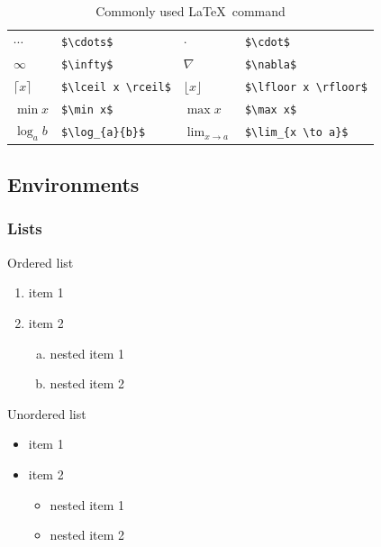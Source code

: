 \begin{table}[!ht]
\begin{tabular}{llll}
		$\cdots$                     & \verb|$\cdots$|                     &
		$\cdot$                      & \verb|$\cdot$|                        \\
		$\infty$                     & \verb|$\infty$|                     &
		$\nabla$                     & \verb|$\nabla$|                       \\
		$\lceil x \rceil$            & \verb|$\lceil x \rceil$|            &
		$\lfloor x \rfloor$          & \verb|$\lfloor x \rfloor$|            \\
		$\min x$                     & \verb|$\min x$|                     &
		$\max x$                     & \verb|$\max x$|                       \\
		$\log_{a}{b}$                & \verb|$\log_{a}{b}$|                &
		$\lim_{x \to a} $            & \verb|$\lim_{x \to a}$|               \\
		\bottomrule
	\end{tabular}
	\caption{Commonly used \LaTeX \, command}
	\label{tab: commonly used LaTeX command}
\end{table}

\subsection{Environments}

\subsubsection{Lists}
Ordered list
\begin{enumerate}[1)]
	\item item 1
	\item item 2
	      \begin{enumerate}[a)]
		      \item nested item 1
		      \item nested item 2
	      \end{enumerate}
\end{enumerate}

Unordered list
\begin{itemize}
	\item item 1
	\item item 2
	      \begin{itemize}
		      \item nested item 1
		      \item nested item 2
	      \end{itemize}
\end{itemize}

